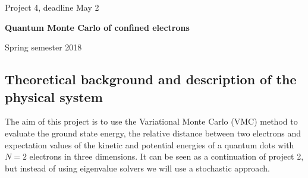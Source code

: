 \documentclass[%
oneside,                 %
final,                   %
10pt]{article}
\begin{document}

\newcommand{\exercisesection}[1]{\subsection*{#1}}






\thispagestyle{empty}

\begin{center}
{\LARGE\bf
\begin{spacing}{1.25}
Project 4, deadline  May 2
\end{spacing}
}
\end{center}


\begin{center}
{\bf Quantum Monte Carlo of confined electrons${}^{}$} \\ [0mm]
\end{center}

\begin{center}
\end{center}
    

\begin{center}
Spring semester 2018
\end{center}

\vspace{1cm}


\subsection{Theoretical background and description of the physical system}

The aim of this project is to use the Variational Monte Carlo (VMC)
method to evaluate the ground state energy, the relative distance between two electrons and
expectation values of the kinetic and potential energies of a quantum dots with $N=2$
electrons in three dimensions. It can be seen as a continuation of project 2, but instead of using eigenvalue solvers
we will use a stochastic approach.
\end{document}
